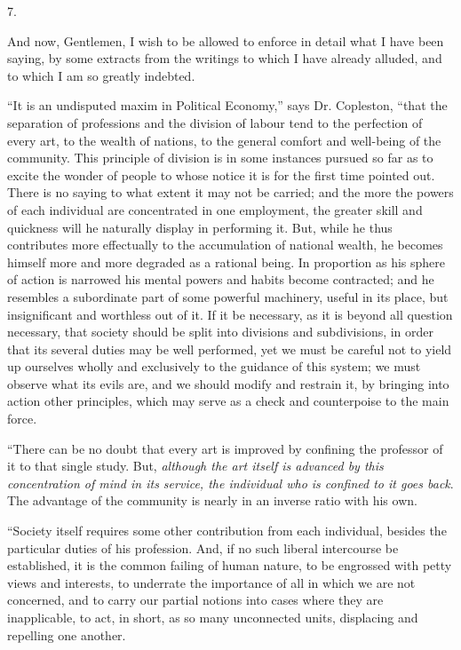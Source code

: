 7.

And now, Gentlemen, I wish to be allowed to enforce in detail what
I have been saying, by some extracts from the writings to which I have
already alluded, and to which I am so greatly indebted.

``It is an undisputed maxim in Political Economy,'' says Dr. Copleston, ``that the separation of professions and the
division of labour tend to the perfection of every art, to the wealth
of nations, to the general comfort and well-being of the community.
This principle of division is in some instances pursued so far as to
excite the wonder of people to whose notice it is for the first time
pointed out. There is no saying to what extent it may not be carried;
and the more the powers of each individual are concentrated in one
employment, the greater skill and quickness will he naturally display
in performing it. But, while he thus contributes more effectually to
the accumulation of national wealth, he becomes himself more and more
degraded as a rational being. In proportion as his sphere of action is
narrowed his mental powers and habits become contracted; and he
resembles a subordinate part of some powerful machinery, useful in its
place, but insignificant and worthless out of it. If it be necessary,
as it is beyond all question necessary, that society should be split
into divisions and subdivisions, in order that its several duties may
be well performed, yet we must be careful not to yield up ourselves
wholly and exclusively to the guidance of this system; we must observe
what its evils are, and we should modify and restrain it, by bringing
into action other principles, which may serve as a check and
counterpoise to the main force.

``There can be no doubt that every art is improved by confining
the professor of it to that single study. But, \emph{although the art
itself is advanced by this concentration of mind in its service, the
individual who is confined to it goes back}. The advantage of the
community is nearly in an inverse ratio with his own.

``Society itself requires some other contribution from each
individual, besides the particular duties of his profession.
And, if no such liberal intercourse be established, it is the common
failing of human nature, to be engrossed with petty views and
interests, to underrate the importance of all in which we are not
concerned, and to carry our partial notions into cases where they are
inapplicable, to act, in short, as so many unconnected units,
displacing and repelling one another.

